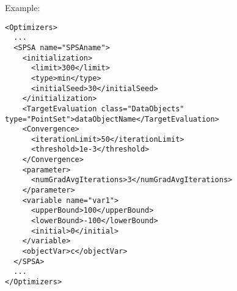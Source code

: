 Example:
\begin{lstlisting}[style=XML]
<Optimizers>
  ...
  <SPSA name="SPSAname">
    <initialization>
      <limit>300</limit>
      <type>min</type>
      <initialSeed>30</initialSeed>
    </initialization>
    <TargetEvaluation class="DataObjects" type="PointSet">dataObjectName</TargetEvaluation>
    <Convergence>
      <iterationLimit>50</iterationLimit>
      <threshold>1e-3</threshold>
    </Convergence>
    <parameter>
      <numGradAvgIterations>3</numGradAvgIterations>
    </parameter>
    <variable name="var1">
      <upperBound>100</upperBound>
      <lowerBound>-100</lowerBound>
      <initial>0</initial>
    </variable>
    <objectVar>c</objectVar>
  </SPSA>
  ...
</Optimizers>
\end{lstlisting}

